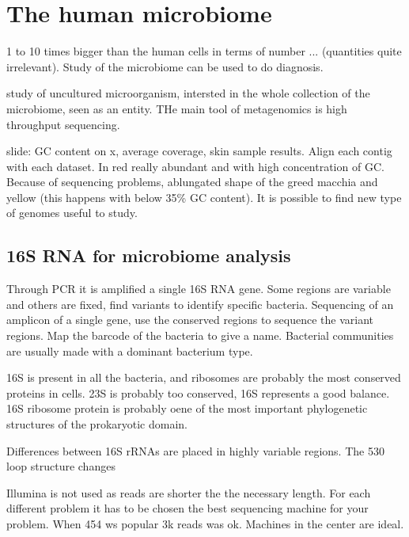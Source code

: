 \section{The human microbiome}
1 to 10 times bigger than the human cells in terms of number ... (quantities quite irrelevant).
Study of the microbiome can be used to do diagnosis. 

study of uncultured microorganism, intersted in the whole collection of the microbiome, seen as an entity. THe main tool of metagenomics is high throughput sequencing.

slide: GC content on x, average coverage, skin sample results. Align each contig with each dataset. In red really abundant and with high concentration of GC. Because of sequencing problems, ablungated shape of the greed macchia and yellow (this happens with below 35\% GC content). It is possible to find new type of genomes useful to study.


\subsection{16S RNA for microbiome analysis}
Through PCR it is amplified a single 16S RNA gene.  Some regions are variable and others are fixed, find variants to identify specific bacteria. Sequencing of an amplicon of a single gene, use the conserved regions to sequence the variant regions. Map the barcode of the bacteria to give a name. Bacterial communities are usually made with a dominant bacterium type. 


16S is present in all the bacteria, and ribosomes are probably the most conserved proteins in cells. 23S is probably too conserved, 16S represents a good balance. 
16S ribosome protein is probably oene of the most important phylogenetic structures of the prokaryotic domain. 

Differences between 16S rRNAs are placed in highly variable regions. The 530 loop structure changes




Illumina is not used as reads are shorter the the necessary length. For each different problem it has to be chosen the best sequencing machine for your problem. 
When 454 ws popular 3k reads was ok. Machines in the center are ideal.


